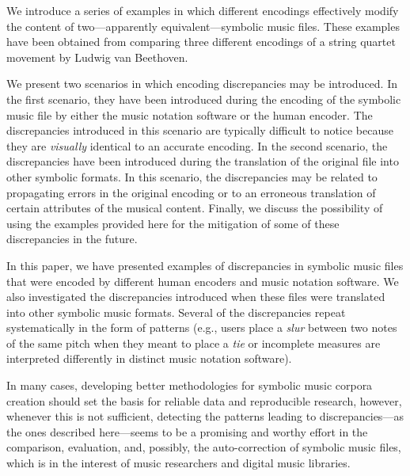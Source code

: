 
We introduce a series of examples in which different encodings effectively modify the content of two---apparently equivalent---symbolic music files. These examples have been obtained from comparing three different encodings of a string quartet movement by Ludwig van Beethoven.

We present two scenarios in which encoding discrepancies may be introduced. In the first scenario, they have been introduced during the encoding of the symbolic music file by either the music notation software or the human encoder. The discrepancies introduced in this scenario are typically difficult to notice because they are \emph{visually} identical to an accurate encoding. In the second scenario, the discrepancies have been introduced during the translation of the original file into other symbolic formats. In this scenario, the discrepancies may be related to propagating errors in the original encoding or to an erroneous translation of certain attributes of the musical content. Finally, we discuss the possibility of using the examples provided here for the mitigation of some of these discrepancies in the future.


In this paper, we have presented examples of discrepancies in symbolic music files that were encoded by different human encoders and music notation software. We also investigated the discrepancies introduced when these files were translated into other symbolic music formats. Several of the discrepancies repeat systematically in the form of patterns (e.g., users place a \emph{slur} between two notes of the same pitch when they meant to place a \emph{tie} or incomplete measures are interpreted differently in distinct music notation software).

In many cases, developing better methodologies for symbolic music corpora creation \cite{mckay2018} should set the basis for reliable data and reproducible research, however, whenever this is not sufficient, detecting the patterns leading to discrepancies---as the ones described here---seems to be a promising and worthy effort in the comparison, evaluation, and, possibly, the auto-correction of symbolic music files, which is in the interest of music researchers and digital music libraries.
